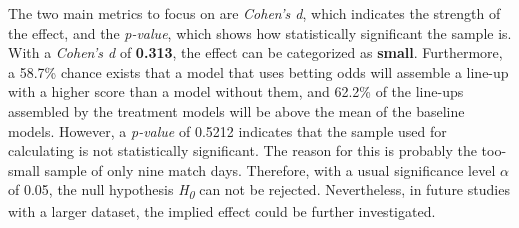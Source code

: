 The two main metrics to focus on are \emph{Cohen's d}, which indicates the strength of the effect, and the \emph{p-value}, which shows how statistically significant the sample is. With a \emph{Cohen's d} of \textbf{0.313}, the effect can be categorized as \textbf{small}. Furthermore, a 58.7\% chance exists that a model that uses betting odds will assemble a line-up with a higher score than a model without them, and 62.2\% of the line-ups assembled by the treatment models will be above the mean of the baseline models. \parencite[cf.][]{magnusson_interpreting_2021} However, a \emph{p-value} of 0.5212 indicates that the sample used for calculating is not statistically significant. The reason for this is probably the too-small sample of only nine match days. Therefore, with a usual significance level $\alpha$ of 0.05, the null hypothesis \emph{H\textsubscript{0}} can not be rejected. Nevertheless, in future studies with a larger dataset, the implied effect could be further investigated.